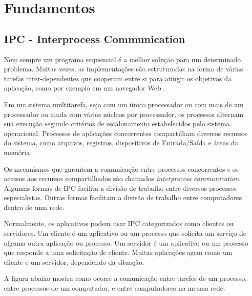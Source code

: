 \chapter[Fundamentos]{Fundamentos}

\section{IPC - Interprocess Communication}\label{sec:ipc}

Nem sempre um programa sequencial é a melhor solução para um determinado
problema. Muitas vezes, as implementações são estruturadas na forma de várias tarefas
inter-dependentes que cooperam entre si para atingir os objetivos da aplicação, como
por exemplo em um navegador Web \cite{sistemas-op-mazierro}.

Em um sistema multitarefa, seja com um único processador ou com mais de um processador ou ainda com vários núcleos por processador, os processos alternam sua execução segundo critérios de escalonamento estabelecidos pelo sistema operacional. Processos de aplicações concorrentes compartilham diversos recursos do sistema, como arquivos, registros, dispositivos de Entrada/Saída e áreas da memória \cite{ipc}.

Os mecanismos que garantem a comunicação entre processos concorrentes e os acessos aos recursos compartilhados são chamados \textit{interprocess communication}. Algumas formas de IPC facilita a divisão de trabalho entre diversos processos especialistas. Outras formas facilitam a divisão de trabalho entre computadores dentro de uma rede.

Normalmente, os aplicativos podem usar IPC categorizados como clientes ou servidores. Um cliente é um aplicativo ou um processo que solicita um serviço de alguma outra aplicação ou processo. Um servidor é um aplicativo ou um processo que responde a uma solicitação de cliente. Muitas aplicações agem como um cliente e um servidor, dependendo da situação. \cite{ipc-microsoft}

A figura abaixo mostra como ocorre a comunicação entre tarefes de um processo, entre processos de um computador, e entre computadores na mesma rede.

